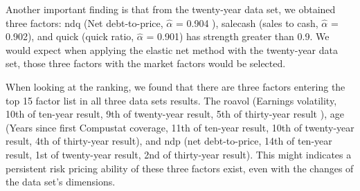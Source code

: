 Another important finding is that from the twenty-year data set, we obtained three factors: ndq (Net debt-to-price, $\hat{\alpha}$ = 0.904 ), salecash (sales to cash, $\hat{\alpha}$ = 0.902), and quick (quick ratio, $\hat{\alpha}$ = 0.901) has strength greater than 0.9.
We would expect when applying the elastic net method with the twenty-year data set, those three factors with the market factors would be selected.

When looking at the ranking, we found that there are three factors entering the top 15 factor list in all three data sets results.
The roavol (Earnings volatility, 10th of ten-year result, 9th of twenty-year result, 5th of thirty-year result ), age (Years since first Compustat coverage, 11th of ten-year result, 10th of twenty-year result, 4th of thirty-year result), and ndp (net debt-to-price, 14th of ten-year result, 1st of twenty-year result, 2nd of thirty-year result).
This might indicates a persistent risk pricing ability of these three factors exist, even with the changes of the data set's dimensions.

